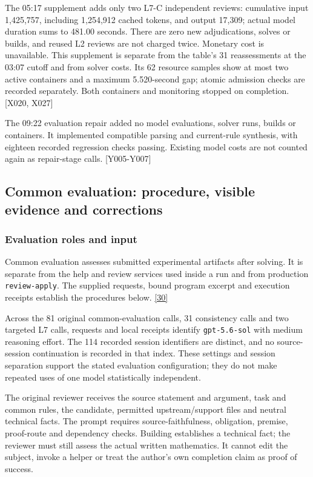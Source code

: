 The 05:17 supplement adds only two L7-C independent reviews: cumulative input 1,425,757, including 1,254,912 cached tokens, and output 17,309; actual model duration sums to 481.00 seconds. There are zero new adjudications, solves or builds, and reused L2 reviews are not charged twice. Monetary cost is unavailable. This supplement is separate from the table's 31 reassessments at the 03:07 cutoff and from solver costs. Its 62 resource samples show at most two active containers and a maximum 5.520-second gap; atomic admission checks are recorded separately. Both containers and monitoring stopped on completion. [X020, X027]

The 09:22 evaluation repair added no model evaluations, solver runs, builds or containers. It implemented compatible parsing and current-rule synthesis, with eighteen recorded regression checks passing. Existing model costs are not counted again as repair-stage calls. [Y005-Y007]

\subsection[Common evaluation: procedure, visible evidence and corrections]{\texorpdfstring{\protect\hypertarget{n6}{}Common evaluation: procedure, visible evidence and corrections}{Common evaluation: procedure, visible evidence and corrections}}
\subsubsection[Evaluation roles and input]{\texorpdfstring{\protect\hypertarget{n6-1}{}Evaluation roles and input}{Evaluation roles and input}}
Common evaluation assesses submitted experimental artifacts after solving. It is separate from the help and review services used inside a run and from production \nolinkurl{review-apply}. The supplied requests, bound program excerpt and execution receipts establish the procedures below. \href{en.pdf\#ref-30}{\mbox{[30]}}

Across the 81 original common-evaluation calls, 31 consistency calls and two targeted L7 calls, requests and local receipts identify \nolinkurl{gpt-5.6-sol} with medium reasoning effort. The 114 recorded session identifiers are distinct, and no source-session continuation is recorded in that index. These settings and session separation support the stated evaluation configuration; they do not make repeated uses of one model statistically independent.

The original reviewer receives the source statement and argument, task and common rules, the candidate, permitted upstream/support files and neutral technical facts. The prompt requires source-faithfulness, obligation, premise, proof-route and dependency checks. Building establishes a technical fact; the reviewer must still assess the actual written mathematics. It cannot edit the subject, invoke a helper or treat the author's own completion claim as proof of success.

